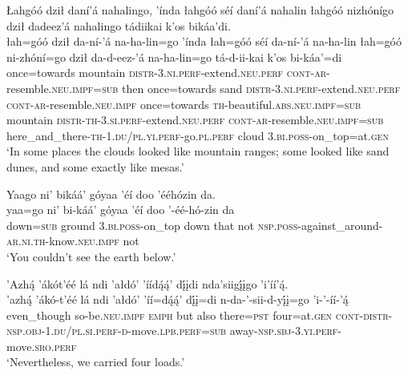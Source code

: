 \ea\label{ex:text9-9-5}
Łahgóó dził daní’á nahalingo, ’índa łahgóó séí daní’á nahalin łahgóó nizhónígo dził dadeez’á nahalingo tádiikai k’os bikáa’di.\\
\gll łah=góó	dził	da-ní-’á	na-ha-lin=go	’índa	łah=góó	séí	da-ní-’á	na-ha-lin	łah=góó	ni-zhóní=go	dził	da-d-eez-’á	na-ha-lin=go	tá-d-ii-kai	k’os	bi-káa’=di\\
     once=towards	mountain	\textsc{distr}-3.\textsc{ni}.\textsc{perf}-extend.\textsc{neu}.\textsc{perf}	\textsc{cont}-\textsc{ar}-resemble.\textsc{neu}.\textsc{impf}=\textsc{sub}	then	once=towards	sand	\textsc{distr}-3.\textsc{ni}.\textsc{perf}-extend.\textsc{neu}.\textsc{perf}	\textsc{cont}-\textsc{ar}-resemble.\textsc{neu}.\textsc{impf}	once=towards	\textsc{th}-beautiful.\textsc{abs}.\textsc{neu}.\textsc{impf}=\textsc{sub}	mountain	\textsc{distr}-\textsc{th}-3.\textsc{si}.\textsc{perf}-extend.\textsc{neu}.\textsc{perf}	\textsc{cont}-\textsc{ar}-resemble.\textsc{neu}.\textsc{impf}=\textsc{sub}	here\_and\_there-\textsc{th}-1.\textsc{du}/\textsc{pl}.\textsc{yi}.\textsc{perf}-go.\textsc{pl}.\textsc{perf}	cloud	3.\textsc{bi}.\textsc{poss}-on\_top=at.\textsc{gen}\\
\glt `In some places the clouds looked like mountain ranges; some looked like sand dunes, and some exactly like mesas.'
\z

\ea\label{ex:text9-9-6}
Yaago ni’ bikáá’ góyaa ’éí doo ’ééhózin da.\\
\gll yaa=go	ni’	bi-káá’	góyaa	’éí	doo	’-éé-hó-zin	da\\
     down=\textsc{sub}	ground	3.\textsc{bi}.\textsc{poss}-on\_top	down	that	not	\textsc{nsp}.\textsc{poss}-against\_around-\textsc{ar}.\textsc{ni}.\textsc{th}-know.\textsc{neu}.\textsc{impf}	not\\
\glt `You couldn't see the earth below.'
\z

\newpage
\ea\label{ex:text9-9-7}
’Azhą́ ’ákót’éé lá ndi ’ałdó’ ’íídą́ą́’ dį́įdi nda’siigį́įgo ’i’íí’ą́.\\
\gll ’azhą́	’ákó-t’éé	lá	ndi	’ałdó’	’íí=dą́ą́’	dį́į=di	n-da-’-sii-d-yį́į=go	’i-’-íí-’ą́\\
     even\_though	so-be.\textsc{neu}.\textsc{impf}	\textsc{emph}	but	also	there=\textsc{pst}	four=at.\textsc{gen}	\textsc{cont}-\textsc{distr}-\textsc{nsp}.\textsc{obj}-1.\textsc{du}/\textsc{pl}.\textsc{si}.\textsc{perf}-\textsc{d}-move.\textsc{lpb}.\textsc{perf}=\textsc{sub}	away-\textsc{nsp}.\textsc{sbj}-3.\textsc{yi}.\textsc{perf}-move.\textsc{sro}.\textsc{perf}\\
\glt `Nevertheless, we carried four loads.'
\z

